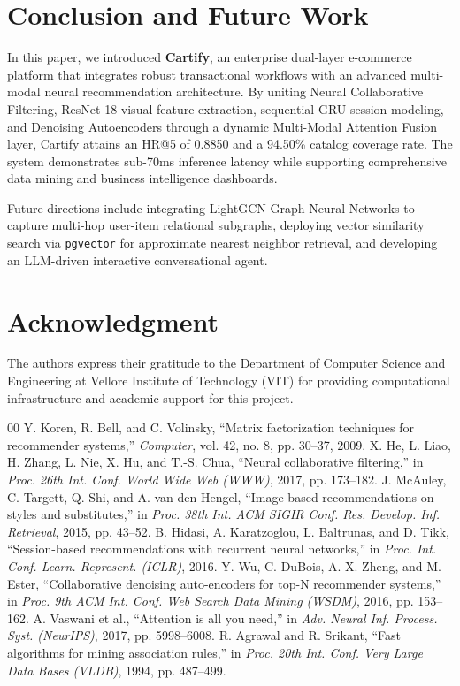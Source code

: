 \documentclass[conference]{IEEEtran}
\begin{document}
\section{Conclusion and Future Work}
In this paper, we introduced \textbf{Cartify}, an enterprise dual-layer e-commerce platform that integrates robust transactional workflows with an advanced multi-modal neural recommendation architecture. By uniting Neural Collaborative Filtering, ResNet-18 visual feature extraction, sequential GRU session modeling, and Denoising Autoencoders through a dynamic Multi-Modal Attention Fusion layer, Cartify attains an HR@5 of 0.8850 and a 94.50\% catalog coverage rate. The system demonstrates sub-70ms inference latency while supporting comprehensive data mining and business intelligence dashboards.

Future directions include integrating LightGCN Graph Neural Networks to capture multi-hop user-item relational subgraphs, deploying vector similarity search via \texttt{pgvector} for approximate nearest neighbor retrieval, and developing an LLM-driven interactive conversational agent.

\section*{Acknowledgment}
The authors express their gratitude to the Department of Computer Science and Engineering at Vellore Institute of Technology (VIT) for providing computational infrastructure and academic support for this project.

\begin{thebibliography}{00}
 Y. Koren, R. Bell, and C. Volinsky, ``Matrix factorization techniques for recommender systems,'' \textit{Computer}, vol. 42, no. 8, pp. 30--37, 2009.
 X. He, L. Liao, H. Zhang, L. Nie, X. Hu, and T.-S. Chua, ``Neural collaborative filtering,'' in \textit{Proc. 26th Int. Conf. World Wide Web (WWW)}, 2017, pp. 173--182.
 J. McAuley, C. Targett, Q. Shi, and A. van den Hengel, ``Image-based recommendations on styles and substitutes,'' in \textit{Proc. 38th Int. ACM SIGIR Conf. Res. Develop. Inf. Retrieval}, 2015, pp. 43--52.
 B. Hidasi, A. Karatzoglou, L. Baltrunas, and D. Tikk, ``Session-based recommendations with recurrent neural networks,'' in \textit{Proc. Int. Conf. Learn. Represent. (ICLR)}, 2016.
 Y. Wu, C. DuBois, A. X. Zheng, and M. Ester, ``Collaborative denoising auto-encoders for top-N recommender systems,'' in \textit{Proc. 9th ACM Int. Conf. Web Search Data Mining (WSDM)}, 2016, pp. 153--162.
 A. Vaswani et al., ``Attention is all you need,'' in \textit{Adv. Neural Inf. Process. Syst. (NeurIPS)}, 2017, pp. 5998--6008.
 R. Agrawal and R. Srikant, ``Fast algorithms for mining association rules,'' in \textit{Proc. 20th Int. Conf. Very Large Data Bases (VLDB)}, 1994, pp. 487--499.
\end{thebibliography}
\end{document}
